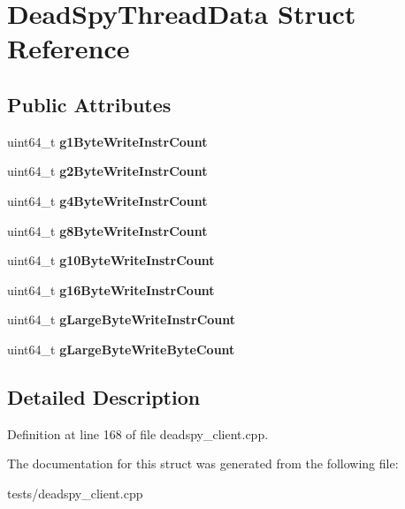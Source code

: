 \hypertarget{structDeadSpyThreadData}{\section{Dead\-Spy\-Thread\-Data Struct Reference}
\label{structDeadSpyThreadData}
}
\subsection*{Public Attributes}
\begin{DoxyCompactItemize}
\item 
\hypertarget{structDeadSpyThreadData_af2a50b360e42dce0dd2a7a06cae90cc4}{uint64\-\_\-t {\bfseries g1\-Byte\-Write\-Instr\-Count}}\label{structDeadSpyThreadData_af2a50b360e42dce0dd2a7a06cae90cc4}

\item 
\hypertarget{structDeadSpyThreadData_a587b91cee2dd533f50f2a1c6c49916cb}{uint64\-\_\-t {\bfseries g2\-Byte\-Write\-Instr\-Count}}\label{structDeadSpyThreadData_a587b91cee2dd533f50f2a1c6c49916cb}

\item 
\hypertarget{structDeadSpyThreadData_a6204f84439c1df833d1f5d443d8cde34}{uint64\-\_\-t {\bfseries g4\-Byte\-Write\-Instr\-Count}}\label{structDeadSpyThreadData_a6204f84439c1df833d1f5d443d8cde34}

\item 
\hypertarget{structDeadSpyThreadData_a3876cf6ffa7bfc61a0520b2691448238}{uint64\-\_\-t {\bfseries g8\-Byte\-Write\-Instr\-Count}}\label{structDeadSpyThreadData_a3876cf6ffa7bfc61a0520b2691448238}

\item 
\hypertarget{structDeadSpyThreadData_af015cb0cddcb66d7fb9bc2283fbd92e7}{uint64\-\_\-t {\bfseries g10\-Byte\-Write\-Instr\-Count}}\label{structDeadSpyThreadData_af015cb0cddcb66d7fb9bc2283fbd92e7}

\item 
\hypertarget{structDeadSpyThreadData_a302228343f975df6222a3c04883431d6}{uint64\-\_\-t {\bfseries g16\-Byte\-Write\-Instr\-Count}}\label{structDeadSpyThreadData_a302228343f975df6222a3c04883431d6}

\item 
\hypertarget{structDeadSpyThreadData_a1bd617ddb8b60048a10955e48ba293c5}{uint64\-\_\-t {\bfseries g\-Large\-Byte\-Write\-Instr\-Count}}\label{structDeadSpyThreadData_a1bd617ddb8b60048a10955e48ba293c5}

\item 
\hypertarget{structDeadSpyThreadData_ac09ec147520bd641c4549ae34b0b0cbf}{uint64\-\_\-t {\bfseries g\-Large\-Byte\-Write\-Byte\-Count}}\label{structDeadSpyThreadData_ac09ec147520bd641c4549ae34b0b0cbf}

\end{DoxyCompactItemize}


\subsection{Detailed Description}


Definition at line 168 of file deadspy\-\_\-client.\-cpp.



The documentation for this struct was generated from the following file\-:\begin{DoxyCompactItemize}
\item 
tests/deadspy\-\_\-client.\-cpp\end{DoxyCompactItemize}
